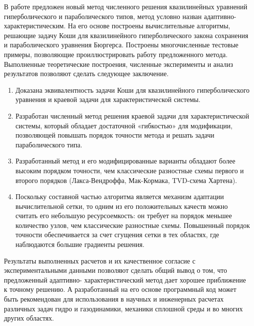 \documentclass[a4paper, 12pt]{article}
\begin{document}
В работе предложен новый метод численного решения квазилинейных уравнений
гиперболического и параболического типов, метод условно назван адаптивно-
характеристическим. На его основе построены вычислительные алгоритмы, решающие 
задачу Коши для квазилинейного гиперболического закона сохранения и 
параболического уравнения Бюргерса. Построены многочисленные тестовые примеры, 
позволяющие проиллюстрировать работу предложенного метода.\\
Выполненные теоретические построения, численные эксперименты и анализ 
результатов позволяют сделать следующее заключение.
\begin{enumerate}
    \item Доказана эквивалентность задачи Коши для квазилинейного 
        гиперболического уравнения и краевой задачи для характеристической 
        системы.
    \item Разработан численный метод решения краевой задачи для 
        характеристической системы, который обладает достаточной «гибкостью» 
        для модификации, позволяющей повышать порядок точности метода и решать 
        задачи параболического типа.
    \item Разработанный метод и его модифицированные варианты обладают более 
        высоким порядком точности, чем классические разностные схемы первого и 
        второго порядков (Лакса-Вендроффа, Мак-Кормака, TVD-схема Хартена).
    \item Поскольку составной частью алгоритма является механизм адаптации 
        вычислительной сетки, то одним из его положительных качеств можно 
        считать его небольшую ресурсоемкость: он требует на порядок меньшее 
        количество узлов, чем классические разностные схемы. Повышенный порядок 
        точности обеспечивается за счет сгущения сетки в тех областях, где 
        наблюдаются большие градиенты решения.
\end{enumerate}
Результаты выполненных расчетов и их качественное согласие с экспериментальными 
данными позволяют сделать общий вывод о том, что предложенный адаптивно-
характеристический метод дает хорошее приближение к точному решению. А 
разработанный на его основе программный код может быть рекомендован для 
использования в научных и инженерных расчетах различных задач гидро и 
газодинамики, механики сплошной среды и во многих других областях.
\end{document}
